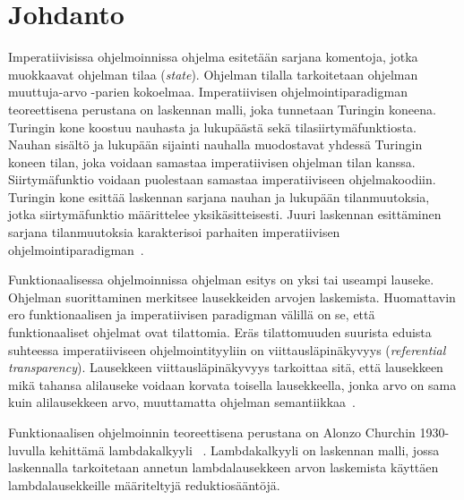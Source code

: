 \section{Johdanto}

Imperatiivisissa ohjelmoinnissa ohjelma esitetään sarjana komentoja, jotka muokkaavat ohjelman tilaa (\textit{state}). Ohjelman tilalla tarkoitetaan ohjelman muuttuja-arvo -parien kokoelmaa. Imperatiivisen ohjelmointiparadigman teoreettisena perustana on laskennan malli, joka tunnetaan Turingin koneena. Turingin kone koostuu nauhasta ja lukupäästä sekä tilasiirtymäfunktiosta. Nauhan sisältö ja lukupään sijainti nauhalla muodostavat yhdessä Turingin koneen tilan, joka voidaan samastaa imperatiivisen ohjelman tilan kanssa. Siirtymäfunktio voidaan puolestaan samastaa imperatiiviseen ohjelmakoodiin. Turingin kone esittää laskennan sarjana nauhan ja lukupään tilanmuutoksia, jotka siirtymäfunktio määrittelee yksikäsitteisesti. Juuri laskennan esittäminen sarjana tilanmuutoksia karakterisoi parhaiten imperatiivisen ohjelmointiparadigman~\cite[s.~3]{Hudak89}.
\par
Funktionaalisessa ohjelmoinnissa ohjelman esitys on yksi tai useampi lauseke. Ohjelman suorittaminen merkitsee lausekkeiden arvojen laskemista. Huomattavin ero funktionaalisen ja imperatiivisen paradigman välillä on se, että funktionaaliset ohjelmat ovat tilattomia. Eräs tilattomuuden suurista eduista suhteessa imperatiiviseen ohjelmointityyliin on viittausläpinäkyvyys (\textit{referential transparency}). Lausekkeen viittausläpinäkyvyys tarkoittaa sitä, että lausekkeen mikä tahansa alilauseke voidaan korvata toisella lausekkeella, jonka arvo on sama kuin alilausekkeen arvo, muuttamatta ohjelman semantiikkaa~\cite[s.~5]{Hudak89}.  
\par
Funktionaalisen ohjelmoinnin teoreettisena perustana on Alonzo Churchin 1930-luvulla kehittämä lambdakalkyyli ~\cite[s.~37--50]{PJ1987}. Lambdakalkyyli on laskennan malli, jossa laskennalla tarkoitetaan annetun lambdalausekkeen arvon laskemista käyttäen lambdalausekkeille määriteltyjä reduktiosääntöjä.